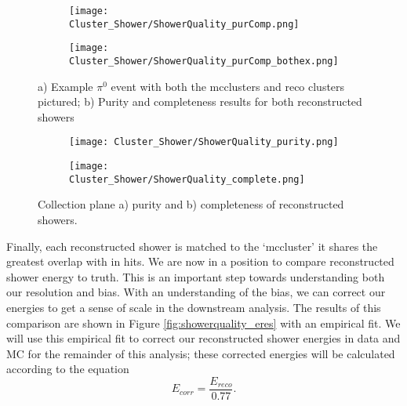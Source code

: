 \documentclass{article}
\begin{document}
\begin{figure}[t!]
\centering
  \begin{subfigure}[t]{0.4\textwidth}
    \centering
\texttt{[image: Cluster\_Shower/ShowerQuality\_purComp.png]}
  \caption{ }
  \end{subfigure} 
  \hspace{5mm}
  \begin{subfigure}[t]{0.45\textwidth}
    \centering
\texttt{[image: Cluster\_Shower/ShowerQuality\_purComp\_bothex.png]}
  \caption{ }
  \end{subfigure} 
\caption{a) Example $\pi^0$ event with both the mcclusters and reco clusters pictured; b) Purity and completeness results for both reconstructed showers }
\label{fig:showerquality_purcompex}
\end{figure}


\begin{figure}[t!]
\centering
  \begin{subfigure}[t]{0.45\textwidth}
    \centering
\texttt{[image: Cluster\_Shower/ShowerQuality\_purity.png]}
  \caption{ }
  \end{subfigure} 
  \hspace{3mm}
  \begin{subfigure}[t]{0.45\textwidth}
    \centering
\texttt{[image: Cluster\_Shower/ShowerQuality\_complete.png]}
  \caption{ }
  \end{subfigure} 
\caption{Collection plane a) purity and b) completeness of reconstructed showers. }
\label{fig:showerquality_purcomp}
\end{figure}

\par  Finally, each reconstructed shower is matched to the `mccluster' it shares the greatest overlap with in hits. We are now in a position to compare reconstructed shower energy to truth. This is an important step towards understanding both our resolution and bias. With an understanding of the bias, we can correct our energies to get a sense of scale in the downstream analysis. The results of this comparison are shown in Figure \ref{fig:showerquality_eres} with an empirical fit. We will use this empirical fit to correct our reconstructed shower energies in data and MC for the remainder of this analysis; these corrected energies will be calculated according to the equation
\begin{equation}
\label{eq:ecorr}
E_{corr} = \frac{E_{reco}}{0.77} .
\end{equation}
\end{document}
